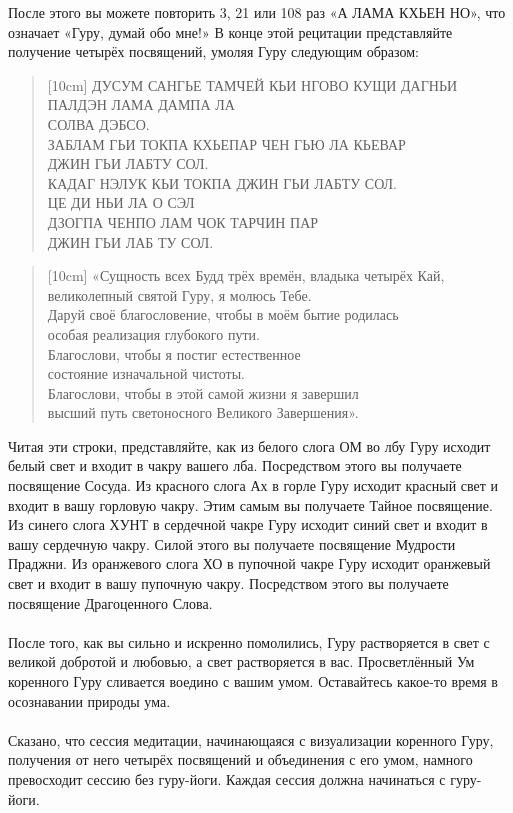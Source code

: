 \newpage
После этого вы можете повторить 3, 21 или 108 раз «А ЛАМА КХЬЕН НО»,
что означает «Гуру, думай обо мне!» В конце этой рецитации представляйте
получение четырёх посвящений, умоляя Гуру следующим образом:
\begin{verse}[10cm]
\small
ДУСУМ САНГЬЕ ТАМЧЕЙ КЬИ НГОВО КУЩИ ДАГНЬИ \\
ПАЛДЭН ЛАМА ДАМПА ЛА \\
СОЛВА ДЭБСО.\\
ЗАБЛАМ ГЬИ ТОКПА КХЬЕПАР ЧЕН ГЬЮ ЛА КЬЕВАР \\
ДЖИН ГЬИ ЛАБТУ СОЛ.\\
КАДАГ НЭЛУК КЬИ ТОКПА ДЖИН ГЬИ ЛАБТУ СОЛ.\\
ЦЕ ДИ НЬИ ЛА О СЭЛ \\
ДЗОГПА ЧЕНПО ЛАМ ЧОК ТАРЧИН ПАР \\
ДЖИН ГЬИ ЛАБ ТУ СОЛ.
\end{verse}
\normalsize
\begin{verse}[10cm]
«Сущность всех Будд трёх времён, владыка четырёх Кай, \\ \indent великолепный святой Гуру, я молюсь Тебе.\\
Даруй своё благословение, чтобы в моём бытие родилась \\ \indent особая реализация глубокого пути.\\
Благослови, чтобы я постиг естественное \\ \indent состояние изначальной чистоты.\\
Благослови, чтобы в этой самой жизни я завершил \\ \indent высший путь светоносного Великого Завершения».
\end{verse}
Читая эти строки, представляйте, как из белого слога ОМ во лбу Гуру исходит белый свет и входит в чакру вашего лба. Посредством этого вы получаете посвящение Сосуда. Из красного слога Ах в горле Гуру исходит красный свет и входит в вашу горловую чакру. Этим самым вы получаете Тайное посвящение. Из синего слога ХУНТ в сердечной чакре Гуру исходит синий свет и входит в вашу сердечную чакру. Силой этого вы получаете посвящение Мудрости Праджни. Из оранжевого слога ХО в пупочной чакре Гуру исходит оранжевый свет и входит в вашу пупочную чакру. Посредством этого вы получаете посвящение Драгоценного Слова.
\\ \\ После того, как вы сильно и искренно помолились, Гуру растворяется в свет с великой добротой и любовью, а свет растворяется в вас. Просветлённый Ум коренного Гуру сливается воедино с вашим умом. Оставайтесь какое-то время в осознавании природы ума.
\\ \\ Сказано, что сессия медитации, начинающаяся с визуализации коренного Гуру, получения от него четырёх посвящений и объединения с его умом, намного превосходит сессию без гуру-йоги. Каждая сессия должна начинаться с гуру-йоги.
